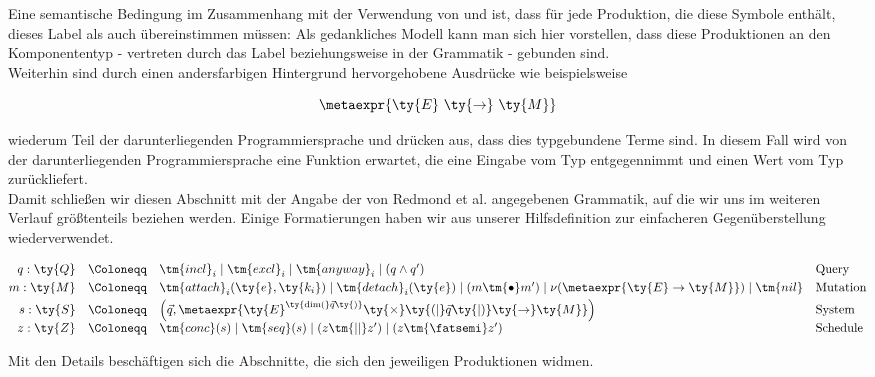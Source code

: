\noindent
Eine semantische Bedingung im Zusammenhang mit der Verwendung von  und  ist, dass für jede Produktion, die diese Symbole enthält, dieses Label als auch  übereinstimmen müssen: Als gedankliches Modell kann man sich hier vorstellen, dass diese Produktionen an den Komponententyp - vertreten durch das Label beziehungsweise  in der Grammatik - gebunden sind.\\

\noindent
Weiterhin sind durch einen andersfarbigen Hintergrund hervorgehobene Ausdrücke wie beispielsweise

\[
    \metaexpr{\ty{E}\ \ty{\rightarrow}\ \ty{M}}
\]

\noindent
wiederum Teil der darunterliegenden Programmiersprache und drücken aus, dass dies typgebundene Terme sind.
In diesem Fall wird von der darunterliegenden Programmiersprache eine Funktion erwartet, die eine Eingabe vom Typ  entgegennimmt und einen Wert vom Typ  zurückliefert.\\


\bigskip
\noindent
Damit schließen wir diesen Abschnitt mit der Angabe der von Redmond et {al.} angegebenen Grammatik, auf die wir uns im weiteren Verlauf größtenteils beziehen werden.
Einige Formatierungen haben wir aus unserer Hilfsdefinition zur einfacheren Gegenüberstellung wiederverwendet.

\[
    \begin{array}{@{}rcll@{}}
        q : \ty{Q}
        &\Coloneqq&
        \tm{incl}_{i}
        \mid
        \tm{excl}_{i}
        \mid
        \tm{anyway}_{i}
        \mid
        (q \land q')
        &
        \text{Query}
        \\[1mm]

        m : \ty{M}
        &\Coloneqq&
        \tm{attach}_{i}(\ty{e},\ty{k_i})
        \mid
        \tm{detach}_{i}(\ty{e})
        \mid
        (m \tm{\bullet} m')
        \mid
        \nu\!\left(\metaexpr{\ty{E} \rightarrow \ty{M}}\right)
        \mid
        \tm{nil}
        &
        \text{Mutation}
        \\[1mm]

        s : \ty{S}
        &\Coloneqq&
        \left(
            \vec{q},
            \metaexpr{
                \ty{E}^{\ty{\mathrm{dim}(}\vec{q}\ty{)}}
                \ty{\times}
                \ty{(|}\vec{q}\ty{|)}
                \ty{\rightarrow}
                \ty{M}
            }
        \right)
        &
        \text{System}
        \\[1mm]

        z : \ty{Z}
        &\Coloneqq&
        \tm{conc}(s)
        \mid
        \tm{seq}(s)
        \mid
        (z \tm{||} z')
        \mid
        (z \tm{\fatsemi} z')
        &
        \text{Schedule}
    \end{array}
\]

\noindent
Mit den Details beschäftigen sich die Abschnitte, die sich den jeweiligen Produktionen widmen.

